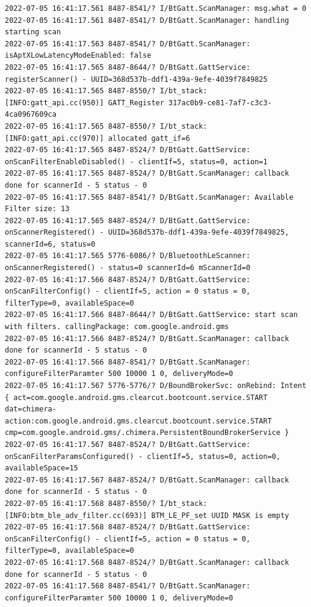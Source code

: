 \documentclass[a4paper,12pt]{book}
\begin{document}
\begin{lstlisting}
2022-07-05 16:41:17.561 8487-8541/? I/BtGatt.ScanManager: msg.what = 0
2022-07-05 16:41:17.561 8487-8541/? D/BtGatt.ScanManager: handling starting scan
2022-07-05 16:41:17.563 8487-8541/? D/BtGatt.ScanManager: isAptXLowLatencyModeEnabled: false
2022-07-05 16:41:17.565 8487-8644/? D/BtGatt.GattService: registerScanner() - UUID=368d537b-ddf1-439a-9efe-4039f7849825
2022-07-05 16:41:17.565 8487-8550/? I/bt_stack: [INFO:gatt_api.cc(950)] GATT_Register 317ac0b9-ce81-7af7-c3c3-4ca0967609ca
2022-07-05 16:41:17.565 8487-8550/? I/bt_stack: [INFO:gatt_api.cc(970)] allocated gatt_if=6
2022-07-05 16:41:17.565 8487-8524/? D/BtGatt.GattService: onScanFilterEnableDisabled() - clientIf=5, status=0, action=1
2022-07-05 16:41:17.565 8487-8524/? D/BtGatt.ScanManager: callback done for scannerId - 5 status - 0
2022-07-05 16:41:17.565 8487-8541/? D/BtGatt.ScanManager: Available Filter size: 13
2022-07-05 16:41:17.565 8487-8524/? D/BtGatt.GattService: onScannerRegistered() - UUID=368d537b-ddf1-439a-9efe-4039f7849825, scannerId=6, status=0
2022-07-05 16:41:17.565 5776-6086/? D/BluetoothLeScanner: onScannerRegistered() - status=0 scannerId=6 mScannerId=0
2022-07-05 16:41:17.566 8487-8524/? D/BtGatt.GattService: onScanFilterConfig() - clientIf=5, action = 0 status = 0, filterType=0, availableSpace=0
2022-07-05 16:41:17.566 8487-8644/? D/BtGatt.GattService: start scan with filters. callingPackage: com.google.android.gms
2022-07-05 16:41:17.566 8487-8524/? D/BtGatt.ScanManager: callback done for scannerId - 5 status - 0
2022-07-05 16:41:17.566 8487-8541/? D/BtGatt.ScanManager: configureFilterParamter 500 10000 1 0, deliveryMode=0
2022-07-05 16:41:17.567 5776-5776/? D/BoundBrokerSvc: onRebind: Intent { act=com.google.android.gms.clearcut.bootcount.service.START dat=chimera-action:com.google.android.gms.clearcut.bootcount.service.START cmp=com.google.android.gms/.chimera.PersistentBoundBrokerService }
2022-07-05 16:41:17.567 8487-8524/? D/BtGatt.GattService: onScanFilterParamsConfigured() - clientIf=5, status=0, action=0, availableSpace=15
2022-07-05 16:41:17.567 8487-8524/? D/BtGatt.ScanManager: callback done for scannerId - 5 status - 0
2022-07-05 16:41:17.568 8487-8550/? I/bt_stack: [INFO:btm_ble_adv_filter.cc(693)] BTM_LE_PF_set UUID MASK is empty 
2022-07-05 16:41:17.568 8487-8524/? D/BtGatt.GattService: onScanFilterConfig() - clientIf=5, action = 0 status = 0, filterType=0, availableSpace=0
2022-07-05 16:41:17.568 8487-8524/? D/BtGatt.ScanManager: callback done for scannerId - 5 status - 0
2022-07-05 16:41:17.568 8487-8541/? D/BtGatt.ScanManager: configureFilterParamter 500 10000 1 0, deliveryMode=0

\end{lstlisting}
\end{document}
